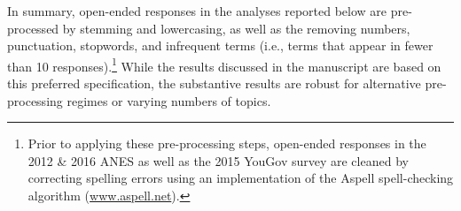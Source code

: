 In summary, open-ended responses in the analyses reported below are pre-processed by stemming and lowercasing, as well as the removing numbers, punctuation, stopwords, and infrequent terms (i.e., terms that appear in fewer than 10 responses).\footnote{Prior to applying these pre-processing steps, open-ended responses in the 2012 \& 2016 ANES as well as the 2015 YouGov survey are cleaned by correcting spelling errors using an implementation of the Aspell spell-checking algorithm (\url{www.aspell.net}).} While the results discussed in the manuscript are based on this preferred specification, the substantive results are robust for alternative pre-processing regimes or varying numbers of topics.


%
%
%
%
%
%
%
%